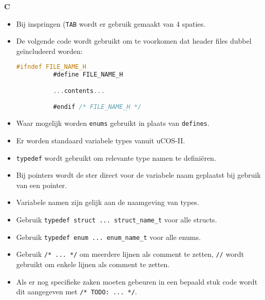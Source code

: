 \textbf{C}
\begin{itemize}
  \item Bij inspringen (\texttt{TAB} wordt er gebruik gemaakt van 4 spaties.
  \item De volgende code wordt gebruikt om te voorkomen dat header files dubbel
        geïncludeerd worden:
        \begin{lstlisting}[language=C,frame=single]
          #ifndef FILE_NAME_H
          #define FILE_NAME_H

          ...contents...

          #endif /* FILE_NAME_H */
        \end{lstlisting}
  \item Waar mogelijk worden \texttt{enums} gebruikt in plaats van \texttt{defines}.
  \item Er worden standaard variabele types vanuit uCOS-II.
  \item \texttt{typedef} wordt gebruikt om relevante type namen te definiëren.
  \item Bij pointers wordt de ster direct voor de variabele naam geplaatst
        bij gebruik van een pointer.
  \item Variabele namen zijn gelijk aan de naamgeving van types.
  \item Gebruik \texttt{typedef struct ... struct\_name\_t} voor alle structs.
  \item Gebruik \texttt{typedef enum ... enum\_name\_t} voor alle enums.
  \item Gebruik \texttt{/* ... */} om meerdere lijnen als comment te zetten,
        \texttt{//} wordt gebruikt om enkele lijnen als comment te zetten.
  \item Als er nog specifieke zaken moeten gebeuren in een bepaald stuk code wordt
        dit aangegeven met \texttt{/* TODO: ... */}.
\end{itemize}        


